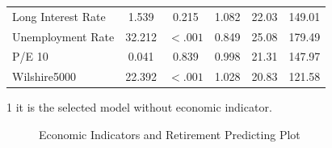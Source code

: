 \documentclass[12pt,letterpaper]{article}
\begin{document}
\begin{table}[h!]
\begin{threeparttable}
\begin{tabular}{L{3cm}ccccc}
			Long Interest Rate & 1.539 & 0.215 & 1.082 & 22.03 & 149.01 \\
			Unemployment Rate & 32.212 & $<.001$ & 0.849 & 25.08 & 179.49 \\
			P/E 10 & 0.041 & 0.839 & 0.998 & 21.31 & 147.97 \\
			Wilshire5000 & 22.392 & $<.001$ & 1.028 & 20.83 & 121.58 \\
			\bottomrule
		\end{tabular}%
		\begin{tablenotes}
		\item[1] it is the selected model without economic indicator.
		\end{tablenotes}
		\end{threeparttable}
		\label{tab:EI}%
	\end{table}%
	   \begin{figure}[h!]
	   	\centering
	   	\caption{Economic Indicators and Retirement Predicting Plot}
	   	\label{fig:EIndex}
	   \end{figure}
	
\end{document}
